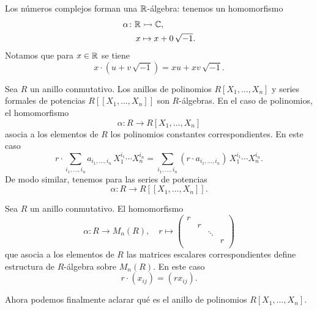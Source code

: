 \begin{ejemplo}
  Los números complejos forman una $\mathbb{R}$-álgebra: tenemos un homomorfismo
  \begin{align*}
    \alpha\colon \mathbb{R} & \rightarrowtail \mathbb{C},\\
    x & \mapsto x + 0\,\sqrt{-1}.
  \end{align*}
  Notamos que para $x\in \mathbb{R}$ se tiene
  $$x\cdot (u + v\,\sqrt{-1}) = xu + xv\,\sqrt{-1}.$$
\end{ejemplo}

\begin{ejemplo}
  Sea $R$ un anillo conmutativo. Los anillos de polinomios $R [X_1,\ldots,X_n]$
  y series formales de potencias $R [\![X_1,\ldots,X_n]\!]$ son $R$-álgebras.
  En el caso de polinomios, el homomorfismo
  $$\alpha\colon R \to R [X_1,\ldots,X_n]$$
  asocia a los elementos de $R$ los polinomios constantes correspondientes.
  En este caso
  \[ r\cdot \sum_{i_1,\ldots,i_n} a_{i_1,\ldots,i_n}\,X_1^{i_1}\cdots X_n^{i_n} =
     \sum_{i_1,\ldots,i_n} (r\cdot a_{i_1,\ldots,i_n})\,X_1^{i_1}\cdots X_n^{i_n}. \]
  De modo similar, tenemos para las series de potencias
  $$\alpha\colon R \to R [\![X_1,\ldots,X_n]\!].$$
\end{ejemplo}

\begin{ejemplo}
  Sea $R$ un anillo conmutativo. El homomorfismo
  \[ \alpha\colon R \to M_n (R), \quad
    r \mapsto \begin{pmatrix}
      r \\
      & r \\
      & & \ddots \\
      & & & r \\
    \end{pmatrix} \]
  que asocia a los elementos de $R$ las matrices escalares correspondientes
  define estructura de $R$-álgebra sobre $M_n (R)$. En este caso
  $$r\cdot (x_{ij}) = (r x_{ij}).$$
\end{ejemplo}

Ahora podemos finalmente aclarar qué es el anillo de polinomios
$R [X_1,\ldots,X_n]$.

